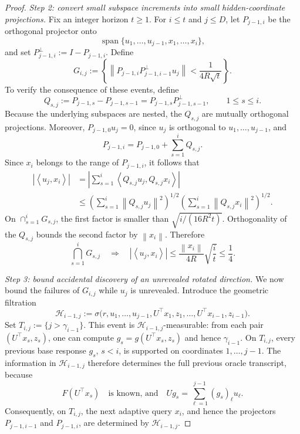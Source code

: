 \documentclass[11pt]{article}
\newcommand{\norm}[1]{\left\lVert #1\right\rVert}
\newcommand{\ip}[2]{\left\langle #1,#2\right\rangle}
\begin{document}
\begin{proof}
\emph{Step 2: convert small subspace increments into small hidden-coordinate projections.}
Fix an integer horizon \(t\ge1\). For \(i\le t\) and \(j\le D\), let
$P_{j-1,i}$ be the orthogonal projector onto
\[
\operatorname{span}\{u_1,\ldots,u_{j-1},x_1,\ldots,x_i\},
\]
and set $P_{j-1,i}^{\perp}:=I-P_{j-1,i}$. Define
\[
G_{i,j}:=
\left\{
\norm{P_{j-1,i}P_{j-1,i-1}^{\perp}u_j}<\frac{1}{4R\sqrt t}
\right\}.
\]
To verify the consequence of these events, define
\[
Q_{s,j}
:=
P_{j-1,s}-P_{j-1,s-1}
=
P_{j-1,s}P_{j-1,s-1}^{\perp},
\qquad 1\le s\le i.
\]
Because the underlying subspaces are nested, the \(Q_{s,j}\) are mutually orthogonal projections. Moreover,
\(P_{j-1,0}u_j=0\), since \(u_j\) is orthogonal to \(u_1,\ldots,u_{j-1}\), and
\[
P_{j-1,i}=P_{j-1,0}+\sum_{s=1}^iQ_{s,j}.
\]
Since \(x_i\) belongs to the range of \(P_{j-1,i}\), it follows that
\begin{align*}
|\ip{u_j}{x_i}|
&=
\left|\sum_{s=1}^i\ip{Q_{s,j}u_j}{Q_{s,j}x_i}\right|\\
&\le
\left(\sum_{s=1}^i\norm{Q_{s,j}u_j}^2\right)^{1/2}
\left(\sum_{s=1}^i\norm{Q_{s,j}x_i}^2\right)^{1/2}.
\end{align*}
On \(\cap_{s=1}^iG_{s,j}\), the first factor is smaller than
\(\sqrt{i/(16R^2t)}\). Orthogonality of the \(Q_{s,j}\) bounds the second factor by \(\norm{x_i}\).
Therefore
\begin{equation}
\label{eq:target-projector-bound}
\bigcap_{s=1}^iG_{s,j}
\quad\Longrightarrow\quad
|\ip{u_j}{x_i}|
\le \frac{\norm{x_i}}{4R}\sqrt{\frac{i}{t}}
\le\frac14.
\end{equation}

\emph{Step 3: bound accidental discovery of an unrevealed rotated direction.}
We now bound the failures of \(G_{i,j}\) while \(u_j\) is unrevealed. Introduce the geometric filtration
\[
\mathcal H_{i-1,j}
:=
\sigma\bigl(r,u_1,\ldots,u_{j-1},
U^\top x_1,z_1,\ldots,U^\top x_{i-1},z_{i-1}\bigr).
\]
Set \(T_{i,j}:=\{j>\gamma_{i-1}\}\). This event is \(\mathcal H_{i-1,j}\)-measurable: from each pair
\((U^\top x_s,z_s)\), one can compute \(g_s=g(U^\top x_s,z_s)\) and hence \(\gamma_{i-1}\). On \(T_{i,j}\), every
previous base response \(g_s\), \(s<i\), is supported on coordinates \(1,\ldots,j-1\). The information in
\(\mathcal H_{i-1,j}\) therefore determines the full previous oracle transcript, because
\[
F(U^\top x_s)
\quad\text{is known, and}\quad
Ug_s=\sum_{\ell=1}^{j-1}(g_s)_\ell u_\ell.
\]
Consequently, on \(T_{i,j}\), the next adaptive query \(x_i\), and hence the projectors
\(P_{j-1,i-1}\) and \(P_{j-1,i}\), are determined by \(\mathcal H_{i-1,j}\).


\end{proof}
\end{document}
